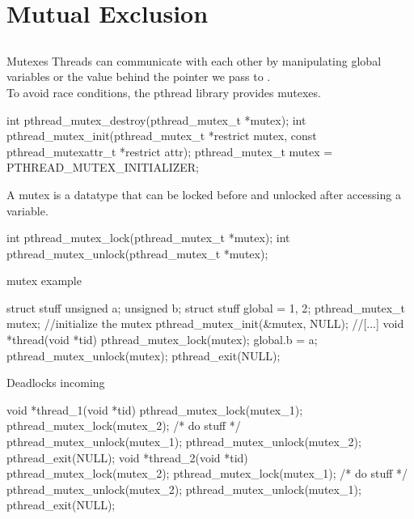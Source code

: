 \documentclass[10pt,graphics,aspectratio=169,table]{beamer}
\begin{document}
\section{Mutual Exclusion}
\subsection{}
\begin{frame}[fragile]{Mutexes}
    Threads can communicate with each other by manipulating global variables or the value behind the  pointer we pass to .\\
    To avoid race conditions, the pthread library provides mutexes.
    \begin{codeblock}
int pthread_mutex_destroy(pthread_mutex_t *mutex);
int pthread_mutex_init(pthread_mutex_t *restrict mutex,
                 const pthread_mutexattr_t *restrict attr);
pthread_mutex_t mutex = PTHREAD_MUTEX_INITIALIZER;
\end{codeblock}
    \bigskip
    
    A mutex is a datatype that can be locked before and unlocked after accessing a variable.
    \begin{codeblock}
int pthread_mutex_lock(pthread_mutex_t *mutex);
int pthread_mutex_unlock(pthread_mutex_t *mutex);
\end{codeblock}
\end{frame}

\begin{frame}[fragile]{mutex example}
    \begin{codeblock}
struct stuff {
    unsigned a;
    unsigned b;
}
struct stuff global = {1, 2};
pthread_mutex_t mutex;
//initialize the mutex
pthread_mutex_init(&mutex, NULL);
//[...]
void *thread(void *tid) {
    pthread_mutex_lock(mutex);
    global.b = a;
    pthread_mutex_unlock(mutex);
    pthread_exit(NULL);
}
\end{codeblock}
\end{frame}

\begin{frame}[fragile]{Deadlocks incoming}
     \begin{codeblock}
void *thread_1(void *tid) {
    pthread_mutex_lock(mutex_1);
    pthread_mutex_lock(mutex_2);
    /* do stuff */
    pthread_mutex_unlock(mutex_1);
    pthread_mutex_unlock(mutex_2);
    pthread_exit(NULL);
}
void *thread_2(void *tid) {
    pthread_mutex_lock(mutex_2);
    pthread_mutex_lock(mutex_1);
    /* do stuff */
    pthread_mutex_unlock(mutex_2);
    pthread_mutex_unlock(mutex_1);
    pthread_exit(NULL);
}
    \end{codeblock}
\end{frame}
\end{document}
